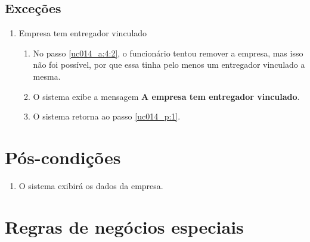 \subsection{Exceções}

\begin{enumerate}[label=E\arabic*]
	\item Empresa tem entregador vinculado \label{uc014_e:1}
	\begin{enumerate}[label*=.\arabic*]
		\item[] No passo \ref{uc014_a:4:2}, o funcionário tentou remover a empresa, mas isso não foi possível, por que essa tinha pelo menos um entregador vinculado a mesma.
		\item O sistema exibe a mensagem \textbf{A empresa tem entregador vinculado}.
		\item O sistema retorna ao passo \ref{uc014_p:1}.
	\end{enumerate}
\end{enumerate}

\section{Pós-condições}

\begin{enumerate}
	\item O sistema exibirá os dados da empresa.
\end{enumerate}

\section{Regras de negócios especiais}

